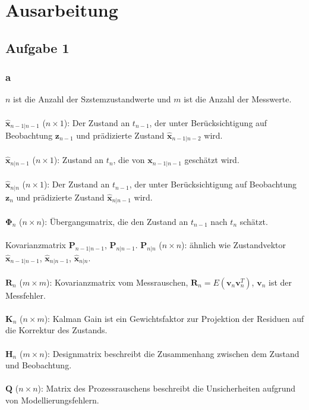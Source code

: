 \chapter{Ausarbeitung}
\section{Aufgabe 1}
\subsection{a}
$n$ ist die Anzahl der Szstemzustandwerte und $m$ ist die Anzahl der Messwerte.\\\\
$\hat{\bm{x}}_{n-1|n-1}$  ($n \times 1$): Der Zustand an $t_{n-1}$, der unter Berücksichtigung auf Beobachtung $\bm{z}_{n-1}$ und prädizierte Zustand $\hat{\bm{x}}_{n-1|n-2}$  wird. \\\\
$\hat{\bm{x}}_{n|n-1}$  ($n \times 1$): Zustand an $t_n$, die von $\bm{x}_{n-1|n-1}$ geschätzt wird. \\\\
$\hat{\bm{x}}_{n|n}$  ($n \times 1$): Der Zustand an $t_{n-1}$, der unter Berücksichtigung auf Beobachtung $\bm{z}_{n}$ und prädizierte Zustand $\hat{\bm{x}}_{n|n-1}$  wird. \\\\
$\bm{\Phi}_n$  ($n \times n$): Übergangsmatrix, die den Zustand an $t_{n-1}$ nach $t_{n}$ schätzt. \\\\
Kovarianzmatrix $\bm{P}_{n-1|n-1}$, $\bm{P}_{n|n-1}$. $\bm{P}_{n|n}$  ($n \times n$):  ähnlich wie Zustandvektor $\hat{\bm{x}}_{n-1|n-1}$, $\hat{\bm{x}}_{n|n-1}$, $\hat{\bm{x}}_{n|n}$.\\\\
$\bm{R}_n$  ($m \times m$): Kovarianzmatrix vom Messrauschen, $\bm{R}_n = E\left(\bm{v}_n \bm{v}_n^T\right)$, $\bm{v}_n$ ist der Messfehler. \\\\
$\bm{K}_n$  ($n \times m$): Kalman Gain ist ein Gewichtsfaktor zur Projektion der Residuen auf die Korrektur des Zustands. \\\\
$\bm{H}_n$  ($m \times n$): Designmatrix beschreibt die Zusammenhang zwischen dem Zustand und Beobachtung. \\\\
$\bm{Q}$  ($n \times n$): Matrix des Prozessrauschens beschreibt die Unsicherheiten aufgrund von Modellierungsfehlern. 
